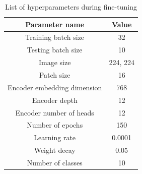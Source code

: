 \begin{table}[htbp]
    \centering
    \caption{List of hyperparameters during fine-tuning}
    \label{tab:fine_para}
    \begin{tabular}{cc}
        \hline
        \textbf{Parameter name} & \textbf{Value} \\ \hline
        Training batch size & 32 \\ 
        Testing batch size & 10 \\
        Image size & 224, 224 \\ 
        Patch size & 16 \\ 
        Encoder embedding dimension & 768 \\ 
        Encoder depth & 12 \\ 
        Encoder number of heads & 12 \\ 
        Number of epochs & 150 \\
        Learning rate & 0.0001 \\ 
        Weight decay & 0.05 \\ 
        Number of classes & 10 \\ \hline
    \end{tabular}
\end{table}


